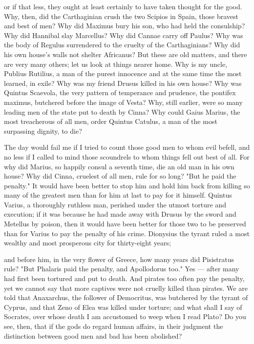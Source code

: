 or if that less, they ought at least certainly to have taken thought for the good. Why, then, did the Carthaginian crush the two Scipios in Spain, those bravest and best of men? Why did Maximus bury his son, who had held the consulship? Why did Hannibal slay Marcellus? Why did Cannae carry off Paulus? Why was the body of Regulus surrendered to the cruelty of the Carthaginians? Why did his own house's walls not shelter Africanus? But these are old matters, and there are very many others; let us look at things nearer home. Why is my uncle, Publius Rutilius, a man of the purest innocence and at the same time the most learned, in exile? Why was my friend Drusus killed in his own house? Why was Quintus Scaevola, the very pattern of temperance and prudence, the pontifex maximus, butchered before the image of Vesta? Why, still earlier, were so many leading men of the state put to death by Cinna? Why could Gaius Marius, the most treacherous of all men, order Quintus Catulus, a man of the most surpassing dignity, to die?

 The day would fail me if I tried to count those good men to whom evil befell, and no less if I called to mind those scoundrels to whom things fell out best of all. For why did Marius, so happily consul a seventh time, die an old man in his own house? Why did Cinna, cruelest of all men, rule for so long? "But he paid the penalty." It would have been better to stop him and hold him back from killing so many of the greatest men than for him at last to pay for it himself. Quintus Varius, a thoroughly ruthless man, perished under the utmost torture and execution; if it was because he had made away with Drusus by the sword and Metellus by poison, then it would have been better for those two to be preserved than for Varius to pay the penalty of his crime. Dionysius the tyrant ruled a most wealthy and most prosperous city for thirty-eight years;

 and before him, in the very flower of Greece, how many years did Pisistratus rule? "But Phalaris paid the penalty, and Apollodorus too." Yes — after many had first been tortured and put to death. And pirates too often pay the penalty, yet we cannot say that more captives were not cruelly killed than pirates. We are told that Anaxarchus, the follower of Democritus, was butchered by the tyrant of Cyprus, and that Zeno of Elea was killed under torture; and what shall I say of Socrates, over whose death I am accustomed to weep when I read Plato? Do you see, then, that if the gods do regard human affairs, in their judgment the distinction between good men and bad has been abolished?

